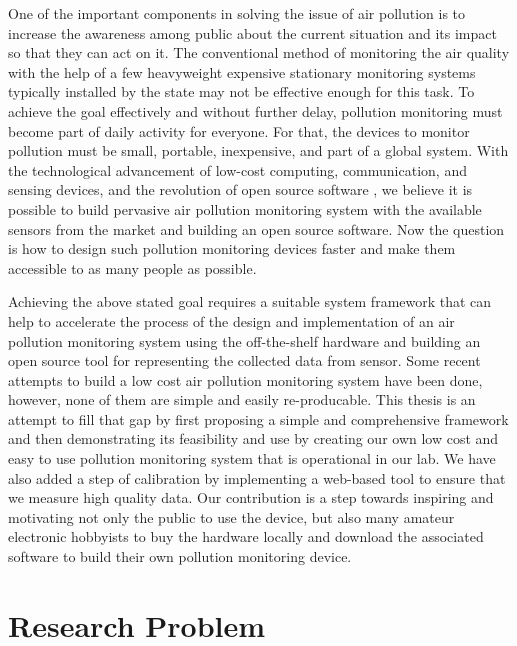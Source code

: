 One of the important components in solving the issue of air pollution is to increase the awareness among public about the current situation and its impact so that they can act on it. The conventional method of monitoring the air quality with the help of a few heavyweight expensive stationary monitoring systems typically installed by the state may not be effective enough for this task. To achieve the goal effectively and without further delay, pollution monitoring must become part of daily activity for everyone. For that, the devices to monitor pollution must be small, portable, inexpensive, and part of a global system. With the technological advancement of low-cost computing, communication, and sensing devices, and the revolution of open source software \cite{Anthes2016}, we believe it is possible to build pervasive air pollution monitoring system with the available sensors from the market and building an open source software. Now the question is how to design such pollution monitoring devices faster and make them accessible to as many people as possible. 

\par

Achieving the above stated goal requires a suitable system framework that can help to accelerate the process of the design and implementation of an air pollution monitoring system using the off-the-shelf hardware and building an open source tool for representing the collected data from sensor. Some recent attempts to build a low cost air pollution monitoring system have been done, however, none of them are simple and easily re-producable. This thesis is an attempt to fill that gap by first proposing a simple and comprehensive framework and then demonstrating its feasibility and use by creating our own low cost and easy to use pollution monitoring system that is operational in our lab. We have also added a step of calibration by implementing a web-based tool to ensure that we measure high quality data. Our contribution is a step towards inspiring and motivating not only the public to use the device, but also many amateur electronic hobbyists to buy the hardware locally and download the associated software to build their own pollution monitoring device.


\section{Research Problem}


